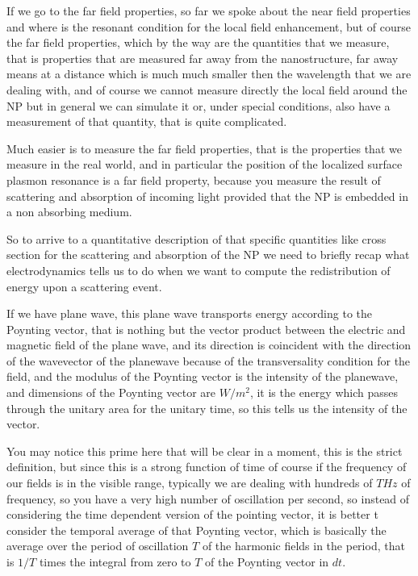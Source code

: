 \documentclass[../main/main.tex]{subfiles}
\begin{document}
If we go to the far field properties, so far we spoke about the near field properties and where is the resonant condition for the local field enhancement, but of course the far field properties, which by the way are the quantities that we measure, that is properties that are measured far away from the nanostructure,
far away means at a distance which is much much smaller then the wavelength that we are dealing with, and of course we cannot measure directly the local field around the NP but in general we can simulate it or, under special conditions, also have a measurement of that quantity, that is quite complicated. 

Much easier is to measure the far field properties, that is the properties that we measure in the real world, and in particular the position of the localized surface plasmon resonance is a far field property, because you measure the result of scattering and absorption of incoming light provided that the NP is embedded in a non absorbing medium.

So to arrive to a quantitative description of that specific quantities like cross section for the scattering and absorption of the NP we need to briefly recap what electrodynamics tells us to do when we want to compute the redistribution of energy upon a scattering event. 

If we have plane wave, this plane wave transports energy according to the Poynting vector, that is nothing but the vector product between the electric and magnetic field of the plane wave, and its direction is coincident with the direction of the wavevector of the planewave because of the transversality condition for the field, and the modulus of the Poynting vector is the intensity of the planewave, and dimensions of the Poynting vector are $W/m^2$, it is the energy which passes through the unitary area for the unitary time, so this tells us the intensity of the vector. 

You may notice this prime here that will be clear in a moment, this is the strict definition, but since this is a strong function of time of course if the frequency of our fields is in the visible range, typically we are dealing with hundreds of $THz$ of frequency, so you have a very high number of oscillation per second, so instead of considering the time dependent version of the pointing vector, it is better t consider the temporal average of that Poynting vector, which is basically the average over the period of oscillation $T$ of the harmonic fields in the period, that is $1/T$ times the integral from zero to $T$ of the Poynting vector in $dt$. 
\end{document}

